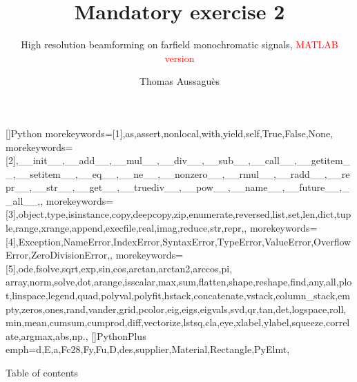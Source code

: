 \documentclass[UKenglish,8pt,aspectratio=1610]{beamer}
\author{Thomas Aussaguès}
\title{Mandatory exercise 2}
\subtitle{High resolution beamforming on farfield monochromatic signals, \textcolor{red}{MATLAB version}}
\begin{document}
	
	
	
	
	[]{Python}{
		morekeywords=[1]{,as,assert,nonlocal,with,yield,self,True,False,None,} %
		morekeywords=[2]{,__init__,__add__,__mul__,__div__,__sub__,__call__,__getitem__,__setitem__,__eq__,__ne__,__nonzero__,__rmul__,__radd__,__repr__,__str__,__get__,__truediv__,__pow__,__name__,__future__,__all__,}, %
		morekeywords=[3]{,object,type,isinstance,copy,deepcopy,zip,enumerate,reversed,list,set,len,dict,tuple,range,xrange,append,execfile,real,imag,reduce,str,repr,}, %
		morekeywords=[4]{,Exception,NameError,IndexError,SyntaxError,TypeError,ValueError,OverflowError,ZeroDivisionError,}, %
		morekeywords=[5]{,ode,fsolve,sqrt,exp,sin,cos,arctan,arctan2,arccos,pi, array,norm,solve,dot,arange,isscalar,max,sum,flatten,shape,reshape,find,any,all,plot,linspace,legend,quad,polyval,polyfit,hstack,concatenate,vstack,column_stack,empty,zeros,ones,rand,vander,grid,pcolor,eig,eigs,eigvals,svd,qr,tan,det,logspace,roll,min,mean,cumsum,cumprod,diff,vectorize,lstsq,cla,eye,xlabel,ylabel,squeeze,correlate,argmax,abs,np.}, %
	}
	[]{PythonPlus}{
		emph={d,E,a,Fc28,Fy,Fu,D,des,supplier,Material,Rectangle,PyElmt},
	}
	
	
	\begin{frame}{Table of contents}
		\tableofcontents
	\end{frame}
	\renewcommand{\arraystretch}{1.3}	
\end{document}
